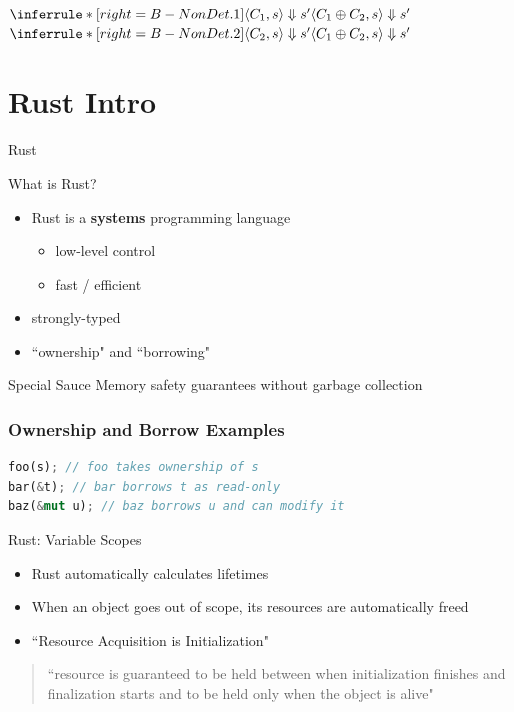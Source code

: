 \documentclass{beamer}
\begin{document}
\begin{frame}{}
\begin{center}
$
\inferrule*[right=B-NonDet.1]{
\langle C_1 , s \rangle \Downarrow s'
 }{ 
\langle C_1 \oplus C_2, s \rangle \Downarrow s'
}
$
\qquad
$
\inferrule*[right=B-NonDet.2]{
\langle C_2, s \rangle \Downarrow s'
 }{ 
\langle C_1 \oplus C_2, s \rangle \Downarrow s'
}
$
\end{center} 
\end{frame}


\section{Rust Intro}
\begin{frame}{Rust}
\begin{block}{What is Rust?}
\begin{itemize}
	\item Rust is a \textbf{systems} programming language
	\begin{itemize}
		\item low-level control
		\item fast / efficient
	\end{itemize}
	\item strongly-typed
	\item ``ownership" and ``borrowing"
\end{itemize}
\end{block}
\begin{block}{Special Sauce} 
Memory safety guarantees without garbage collection
\end{block}
\end{frame}


\begin{frame}[fragile]
\frametitle{Ownership and Borrow Examples}
\begin{lstlisting}[language=Rust]
foo(s); // foo takes ownership of s
bar(&t); // bar borrows t as read-only
baz(&mut u); // baz borrows u and can modify it
\end{lstlisting}
\end{frame}


\begin{frame}{Rust: Variable Scopes}
\begin{block}{} 
\begin{itemize}
\item Rust automatically calculates lifetimes
\item When an object goes out of scope, its resources are automatically freed
\item ``Resource Acquisition is Initialization" 
\end{itemize}
\end{block}
\begin{quote}
``resource is guaranteed to be held between when initialization finishes and finalization starts 
and to be held only when the object is alive"
\end{quote}
\end{frame}
\end{document}

